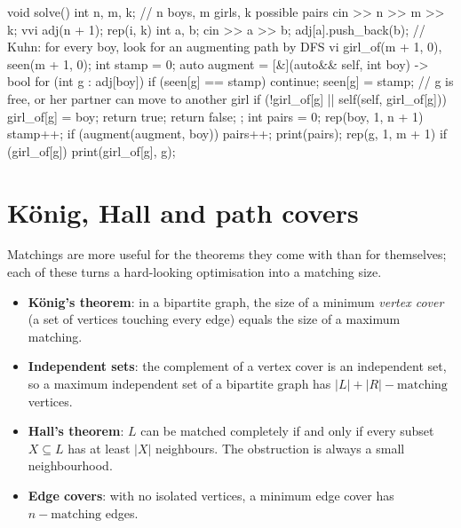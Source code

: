 \begin{code}
void solve() {
    int n, m, k;  // n boys, m girls, k possible pairs
    cin >> n >> m >> k;
    vvi adj(n + 1);
    rep(i, k) {
        int a, b;
        cin >> a >> b;
        adj[a].push_back(b);
    }
    // Kuhn: for every boy, look for an augmenting path by DFS
    vi girl_of(m + 1, 0), seen(m + 1, 0);
    int stamp = 0;
    auto augment = [&](auto&& self, int boy) -> bool {
        for (int g : adj[boy]) {
            if (seen[g] == stamp) continue;
            seen[g] = stamp;
            // g is free, or her partner can move to another girl
            if (!girl_of[g] || self(self, girl_of[g])) {
                girl_of[g] = boy;
                return true;
            }
        }
        return false;
    };
    int pairs = 0;
    rep(boy, 1, n + 1) {
        stamp++;
        if (augment(augment, boy)) pairs++;
    }
    print(pairs);
    rep(g, 1, m + 1) if (girl_of[g]) print(girl_of[g], g);
}
\end{code}


\section[König, Hall and path covers]{König, Hall and path covers \hfill \ioi}\label{sec:konig}

Matchings are more useful for the theorems they come with than for themselves; each of these turns a hard-looking optimisation
into a matching size.

\begin{itemize}
  \item \textbf{König's theorem}: in a bipartite graph, the size of a minimum \emph{vertex cover} (a set of vertices touching every
        edge) equals the size of a maximum matching.
  \item \textbf{Independent sets}: the complement of a vertex cover is an independent set, so a maximum independent set of a
        bipartite graph has $|L| + |R| - \text{matching}$ vertices.
  \item \textbf{Hall's theorem}: $L$ can be matched completely if and only if every subset $X \subseteq L$ has at least $|X|$
        neighbours. The obstruction is always a small neighbourhood.
  \item \textbf{Edge covers}: with no isolated vertices, a minimum edge cover has $n - \text{matching}$ edges.
\end{itemize}

